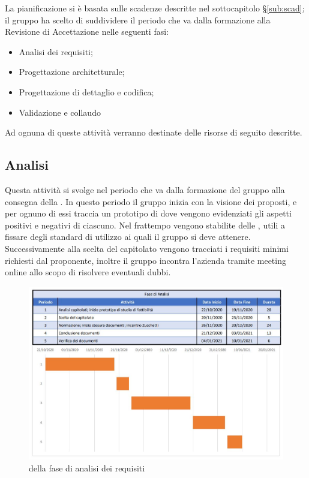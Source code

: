 \documentclass[../piano_di_progetto.tex]{subfiles}
\begin{document}
La pianificazione si è basata sulle scadenze descritte nel sottocapitolo \S\ref{sub:scad}; il gruppo ha scelto di suddividere il periodo che va dalla formazione alla Revisione di Accettazione nelle seguenti fasi:
\begin{itemize}
\item Analisi dei requisiti;
\item Progettazione architetturale;
\item Progettazione di dettaglio e codifica;
\item Validazione e collaudo
\end{itemize}
Ad ognuna di queste attività verranno destinate delle risorse di seguito descritte.


\subsection{Analisi}%
\label{sub:analisi}
Questa attività si svolge nel periodo che va dalla formazione del gruppo alla consegna della . In questo periodo il gruppo inizia con la visione dei  proposti, e per ognuno di essi traccia un prototipo di  dove vengono evidenziati gli aspetti positivi e negativi di ciascuno. Nel frattempo vengono stabilite delle , utili a fissare degli standard di utilizzo ai quali il gruppo si deve attenere. Successivamente alla scelta del capitolato vengono tracciati i requisiti minimi richiesti dal proponente, inoltre il gruppo incontra l’azienda tramite meeting online allo scopo di risolvere eventuali dubbi.\\

\begin{figure}[H]
\centering

\includegraphics[width=12cm]{componenti/img/fase_analisi}
\caption{  della fase di analisi dei requisiti}

\end{figure}
\end{document}
